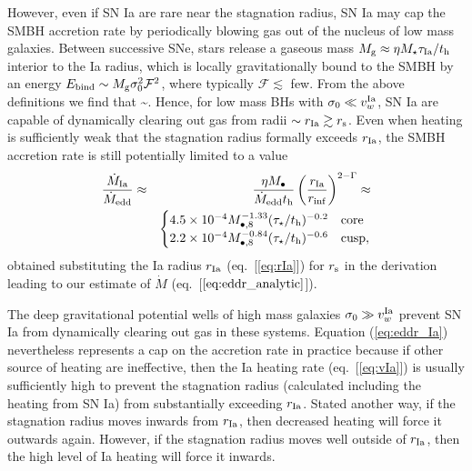 \documentclass[usenatbib,fleqn]{mn2e}
\newcommand{\Mbheight}{M_{\bullet,8}}
\newcommand{\rIa}{r_{\rm Ia}}
\begin{document}
However, even if SN Ia are rare near the stagnation radius, SN Ia may cap the
SMBH accretion rate by periodically blowing gas out of the nucleus of
low mass galaxies.  Between successive SNe, stars release a
gaseous mass $M_{\rm g} \approx \eta M_{\star}\tau_{\rm Ia}/t_{\rm h}$
interior to the Ia radius, which is locally gravitationally bound to the SMBH
by an energy $E_{\rm bind} \sim M_{\rm g}\sigma_0^{2}\mathcal{F}^{2}$, where typically $\mathcal{F} 
\lesssim$ few.  From the above definitions we find that 
\be
{} \sim {}.  
\label{eq:blowout}
\ee
Hence, for low mass BHs with $\sigma_0 \ll v^{\rm Ia}_{w}$, SN Ia are capable of dynamically clearing out gas from radii $\sim r_{\rm Ia} \gtrsim r_{\rm s}$.  Even when heating is sufficiently weak that the stagnation radius formally exceeds $r_{\rm Ia}$, the SMBH accretion rate is still potentially limited to a value
\begin{eqnarray}
\frac{\dot{M}_{\rm Ia}}{\dot{M}_{\rm edd}} &\approx& \frac{\eta M_{\bullet}}{\dot{M}_{\rm edd} t_{\rm h}}\left(\frac{r_{\rm Ia}}{r_{\rm inf}}\right)^{2-\Gamma} \approx \nonumber \\
 && \begin{cases}
    4.5 \times 10^{-4} M_{\bullet,8}^{-1.33}(\tau_{\star}/t_{\rm h})^{-0.2}
   & \text{core} \\
    2.2 \times 10^{-4} \Mbheight^{-0.84}(\tau_{\star}/t_{\rm h})^{-0.6}   & \text{cusp},
  \end{cases}
  \label{eq:eddr_Ia}
\end{eqnarray}
obtained substituting the Ia radius $r_{\rm Ia}$ (eq.~[\ref{eq:rIa}])
for $r_{\rm s}$ in the derivation leading to our estimate of $\dot{M}$
(eq.~[$\ref{eq:eddr_analytic}$]).  

The deep gravitational potential wells of high mass galaxies $\sigma_0
\gg  v^{\rm Ia}_{w}$ prevent SN Ia from dynamically clearing out gas
in these systems.  Equation (\ref{eq:eddr_Ia}) nevertheless represents
a cap on the accretion rate in practice because if other source of
heating are ineffective, then the Ia heating rate (eq.~[\ref{eq:vIa}])
is usually sufficiently high to prevent the stagnation radius
(calculated including the heating from SN Ia) from substantially
exceeding $r_{\rm Ia}$. Stated another way, if the stagnation radius moves inwards from $\rIa$, then decreased heating will force it outwards again. However, if the stagnation radius moves well outside of $\rIa$, then the high level of Ia heating will force it inwards. 
\end{document}
